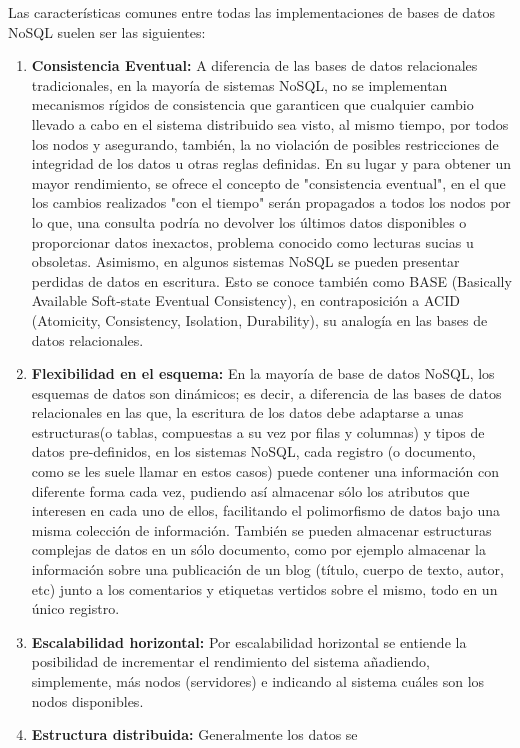 Las características comunes entre todas las implementaciones de
 bases de datos NoSQL suelen ser las siguientes:
\begin{enumerate}
\item \textbf{Consistencia Eventual:} A diferencia de las bases 
de datos relacionales tradicionales, en la mayoría de sistemas
 NoSQL, no se implementan mecanismos rígidos de consistencia 
que garanticen que cualquier cambio llevado a cabo en el sistema
 distribuido sea visto, al mismo tiempo, por todos los nodos y
 asegurando, también, la no violación de posibles restricciones 
de integridad de los datos u otras reglas definidas. En su lugar
 y para obtener un mayor rendimiento, se ofrece el concepto 
de "consistencia eventual", en el que los cambios realizados
 "con el tiempo" serán propagados a todos los nodos por lo que,
 una consulta podría no devolver los últimos datos disponibles
 o proporcionar datos inexactos, problema conocido como
 lecturas sucias u obsoletas.
Asimismo, en algunos sistemas NoSQL se pueden presentar
 perdidas de datos en escritura. Esto se conoce también como 
BASE (Basically Available Soft-state Eventual Consistency), 
en contraposición a ACID (Atomicity, Consistency, Isolation, Durability), 
su analogía en las bases de datos relacionales.
\item \textbf{Flexibilidad en el esquema:} En la mayoría de
 base de datos NoSQL, los esquemas de datos son dinámicos; 
es decir, a diferencia de las bases de datos relacionales en las que,
 la escritura de los datos debe adaptarse a unas estructuras(o tablas, 
compuestas a su vez por filas y columnas) y tipos de datos pre-definidos,
 en los sistemas NoSQL, cada registro (o documento, como se les 
suele llamar en estos casos) puede contener una información con 
diferente forma cada vez, pudiendo así almacenar sólo los atributos 
que interesen en cada uno de ellos, facilitando el polimorfismo de 
datos bajo una misma colección de información. También se pueden 
almacenar estructuras complejas de datos en un sólo documento, 
como por ejemplo almacenar la información sobre una publicación 
de un blog (título, cuerpo de texto, autor, etc) junto a los comentarios
 y etiquetas vertidos sobre el mismo, todo en un único registro.
\item \textbf{Escalabilidad horizontal:} Por escalabilidad horizontal
 se entiende la posibilidad de incrementar el rendimiento del sistema
 añadiendo, simplemente, más nodos (servidores) e indicando al sistema
 cuáles son los nodos disponibles.
\item \textbf{Estructura distribuida:} Generalmente los datos se 

\end{enumerate}
